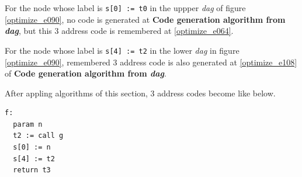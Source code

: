 \begin{Example}
For the node whose label is {\tt{s[0] := t0}} in
the uppper {\em dag} of figure \ref{optimize_e090},
no code is generated at
{\bf Code generation algorithm from {\em dag}},
but this 3 address code is remembered at \ref{optimize_e064}.

For the node whose label is {\tt{s[4] := t2}} in
the lower {\em dag} in figure \ref{optimize_e090}, remembered 3 address code
is also generated at \ref{optimize_e108}
of {\bf Code generation algorithm from {\em dag}}.

After appling algorithms of this section,
3 address codes become like below.
\begin{verbatim}
f:
  param n
  t2 := call g
  s[0] := n
  s[4] := t2
  return t3
\end{verbatim}
\end{Example}

